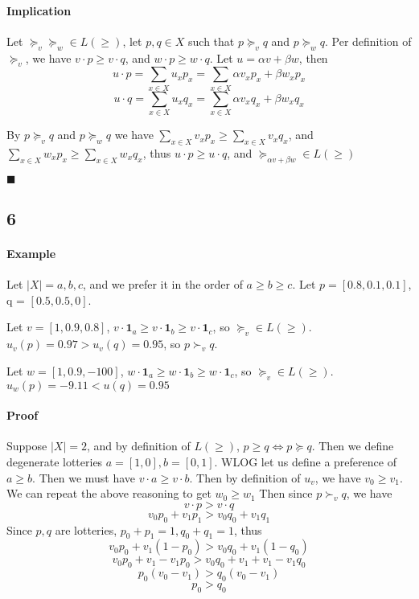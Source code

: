 \documentclass[12pt]{article}
\begin{document}
\paragraph{Implication}
Let $\succeq_v \succeq_w \in L(\geq)$, let $p,q \in X$ such that $p \succeq_v q$ and 
$p \succeq_w q$. Per definition of $\succeq_v$, we have $v \cdot p \geq v \cdot q$, and 
$w \cdot p \geq w \cdot q$. 
Let $u = \alpha v + \beta w$, then 
\[u \cdot p = \sum_{x \in X} u_x p_x = \sum_{x \in X} \alpha v_x p_x + \beta w_x p_x \]
\[u \cdot q = \sum_{x \in X} u_x q_x = \sum_{x \in X} \alpha v_x q_x + \beta w_x q_x \]

By $p \succeq_v q$ and  $p \succeq_w q$ we have $\sum_{x \in X} v_x p_x \geq \sum_{x \in X} v_x q_x$, 
and $\sum_{x \in X} w_x p_x \geq \sum_{x \in X} w_x q_x$, thus $u \cdot p \geq u \cdot q$, and 
$\succeq_{\alpha v + \beta w} \in L(\geq)$

$\blacksquare$
\newpage


\subsection*{6}
\paragraph*{Example}
Let $|X|={a,b,c}$, and we prefer it in the order of $a \geq b \geq c$. Let $p = [0.8, 0.1, 0.1]$, 
q = $[0.5, 0.5, 0]$. 

Let $v = [1, 0.9, 0.8]$, $v \cdot \mathbf{1}_a \geq v \cdot \mathbf{1}_b \geq v \cdot \mathbf{1}_c$, 
so $\succeq_v \in L(\geq)$. $u_v(p) = 0.97 > u_v(q)= 0.95$, so $p \succ_v q$.

Let $w = [1, 0.9, -100]$, $w \cdot \mathbf{1}_a \geq w \cdot \mathbf{1}_b \geq w \cdot \mathbf{1}_c$, 
so $\succeq_v \in L(\geq)$. $u_w(p) = -9.11 < u(q) = 0.95$


\paragraph*{Proof}Suppose $|X|=2$, and by definition of $L(\geq)$, $p \geq q \iff p \succeq q$. 
Then we define degenerate lotteries $a=[1,0], b=[0,1]$. WLOG let us define a 
preference of $a \geq b$. Then we must have $v \cdot a \geq v \cdot b$. Then by definition of $u_v$, 
we have $v_0 \geq v_1$. We can repeat the above reasoning to get $w_0 \geq w_1$
Then since $p \succ_v q$, we have
\[v \cdot p > v \cdot q\]
\[v_0 p_0 + v_1 p_1 > v_0 q_0 + v_1 q_1\]
Since $p, q$ are lotteries, $p_0 + p_1 = 1, q_0+q_1=1$, thus
\[v_0 p_0 + v_1 (1-p_0) > v_0 q_0 + v_1 (1-q_0)\]
\[v_0p_0 + v_1-v_1p_0 > v_0 q_0 + v_1+v_1-v_1q_0\]
\[p_0(v_0-v_1) > q_0(v_0-v_1)\]
\[p_0 > q_0\]
\end{document}

